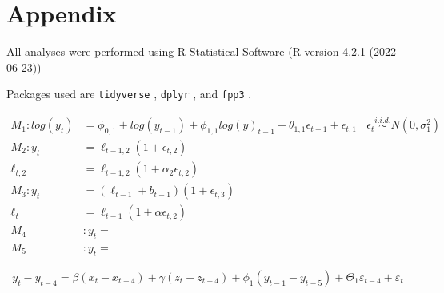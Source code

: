 \documentclass{monashthesis}
\begin{document}
\appendix

\hypertarget{appendix}{%
\chapter{Appendix}\label{appendix}}

All analyses were performed using R Statistical Software (R version 4.2.1 (2022-06-23))

Packages used are \texttt{tidyverse} \autocite{tidy19}, \texttt{dplyr} \autocite{dplyr23}, and \texttt{fpp3} \autocite{fpp23}.

\[\begin{aligned}
M_1: log(y_t) &= \phi_{0,1} + log(y_{t-1}) + \phi_{1,1}log(y)_{t-1} + \theta_{1,1}\epsilon_{t-1} + \epsilon_{t,1} \ \ \ \ \epsilon_t \stackrel{i.i.d.}{\sim} N(0,\sigma_1^2) \\
M_2: y_t &= \ell_{t-1,2}(1+\epsilon_{t,2}) \\
  \ell_{t,2} &= \ell_{t-1,2}(1+\alpha_2\epsilon_{t,2}) \\
M_3: y_t &= (\ell_{t-1}+b_{t-1}) (1+\epsilon_{t,3}) \\
  \ell_t &= \ell_{t-1}(1+\alpha\epsilon_{t,2}) \\
M_4&: y_t = \\
M_5&: y_t = 
\end{aligned}\]

\begin{equation}
  y_t - y_{t-4} = \beta (x_t-x_{t-4}) + \gamma (z_t-z_{t-4}) + \phi_1 (y_{t-1} - y_{t-5}) + \Theta_1 \varepsilon_{t-4} + \varepsilon_t
\end{equation}

\textcite{fpp3}

\printbibliography[title={Reference}]
\end{document}
